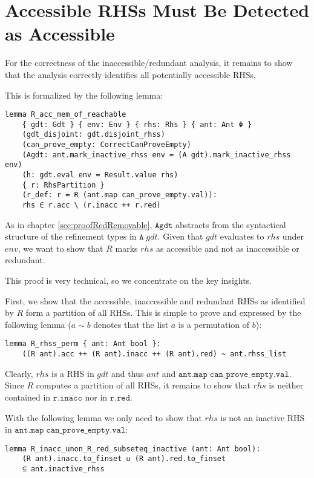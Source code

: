 \section{Accessible RHSs Must Be Detected as Accessible}\label{sec:proofAcc}

For the correctness of the inaccessible/redundant analysis,
it remains to show that the analysis correctly identifies all potentially accessible RHSs.

This is formalized by the following lemma:
\begin{verbatim}
lemma R_acc_mem_of_reachable
    { gdt: Gdt } { env: Env } { rhs: Rhs } { ant: Ant Φ }
    (gdt_disjoint: gdt.disjoint_rhss)
    (can_prove_empty: CorrectCanProveEmpty)
    (Agdt: ant.mark_inactive_rhss env = (A gdt).mark_inactive_rhss env)
    (h: gdt.eval env = Result.value rhs)
    { r: RhsPartition }
    (r_def: r = R (ant.map can_prove_empty.val)):
    rhs ∈ r.acc \ (r.inacc ++ r.red) 
\end{verbatim}
As in chapter \ref{sec:proofRedRemovable}, $\mathtt{Agdt}$ abstracts from the syntactical structure of the refinement types in $\mathtt{A}\;gdt$.
Given that $\mathit{gdt}$ evaluates to $\mathit{rhs}$ under $\mathit{env}$,
we want to show that $R$ marks $\mathit{rhs}$ as accessible and not as inaccessible or redundant.

This proof is very technical, so we concentrate on the key insights.

First, we show that the accessible, inaccessible and redundant RHSs as identified by $R$ form a partition of all RHSs.
This is simple to prove and expressed by the following lemma ($a \sim b$ denotes that the list $a$ is a permutation of $b$):
\begin{verbatim}
lemma R_rhss_perm { ant: Ant bool }:
    ((R ant).acc ++ (R ant).inacc ++ (R ant).red) ~ ant.rhss_list
\end{verbatim}

Clearly, $\mathit{rhs}$ is a RHS in $\mathit{gdt}$ and thus $\mathit{ant}$ and $\mathtt{ant.map\;can\_prove\_empty.val}$.
Since $R$ computes a partition of all RHSs, it remains to show that $\mathit{rhs}$ is neither contained in $\mathtt{r.inacc}$ nor in $\mathtt{r.red}$.

With the following lemma we only need to show that $\mathit{rhs}$ is not an inactive RHS in $\mathtt{ant.map\;can\_prove\_empty.val}$:
\begin{verbatim}
lemma R_inacc_unon_R_red_subseteq_inactive (ant: Ant bool):
    (R ant).inacc.to_finset ∪ (R ant).red.to_finset
    ⊆ ant.inactive_rhss
\end{verbatim}

